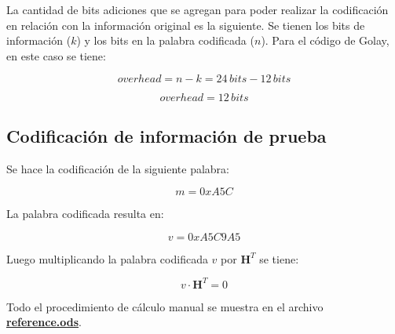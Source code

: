 La cantidad de bits adiciones que se agregan para poder realizar la codificación en relación con la información original es la siguiente.
Se tienen los bits de información ($k$) y los bits en la palabra codificada ($n$). Para el código de Golay, en este caso se tiene:

$$ overhead = n - k = 24 \, bits - 12 \, bits $$

$$ \boxed{overhead = 12 \, bits} $$

\subsection{Codificación de información de prueba}

Se hace la codificación de la siguiente palabra:

$$ m = 0xA5C $$

La palabra codificada resulta en:

$$ \boxed{v = 0xA5C9A5} $$

Luego multiplicando la palabra codificada $v$ por $\textbf{H}^{T}$ se tiene:

$$ v \cdot \textbf{H}^{T} = 0 $$

Todo el procedimiento de cálculo manual se muestra en el archivo \href{https://github.com/AbelCorvalan0/fec-lab2/tree/main/reference-calc}{\textbf{reference.ods}}.
